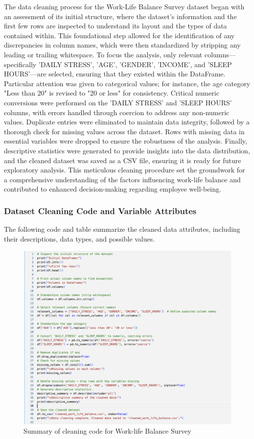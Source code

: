 \documentclass[runningheads]{llncs}
\begin{document}
\begin{enumerate}
The data cleaning process for the Work-Life Balance Survey dataset began with an assessment of its initial structure, where the dataset's information and the first few rows are inspected to understand its layout and the types of data contained within. This foundational step allowed for the identification of any discrepancies in column names, which were then standardized by stripping any leading or trailing whitespace. To focus the analysis, only relevant columns—specifically 'DAILY STRESS', 'AGE', 'GENDER', 'INCOME', and 'SLEEP HOURS'—are selected, ensuring that they existed within the DataFrame. Particular attention was given to categorical values; for instance, the age category "Less than 20" is revised to "20 or less" for consistency. Critical numeric conversions were performed on the 'DAILY STRESS' and 'SLEEP HOURS' columns, with errors handled through coercion to address any non-numeric values. Duplicate entries were eliminated to maintain data integrity, followed by a thorough check for missing values across the dataset. Rows with missing data in essential variables were dropped to ensure the robustness of the analysis. Finally, descriptive statistics were generated to provide insights into the data distribution, and the cleaned dataset was saved as a CSV file, ensuring it is ready for future exploratory analysis. This meticulous cleaning procedure set the groundwork for a comprehensive understanding of the factors influencing work-life balance and contributed to enhanced decision-making regarding employee well-being.

\subsubsection{Dataset Cleaning Code and Variable Attributes}

The following code and table summarize the cleaned data attributes, including their descriptions, data types, and possible values.
\clearpage
\begin{figure}
    \centering
    \includegraphics[width=1.2\linewidth]{CleaningCode1.png}
    \caption{Summary of cleaning code for Work-life Balance Survey} 
    \label{fig:enter-label}
\end{figure}


\end{enumerate}
\end{document}
